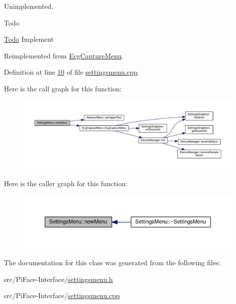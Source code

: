 Unimplemented. 

\begin{DoxyRefDesc}{Todo}
\item[\hyperlink{todo__todo000022}{Todo}]Implement \end{DoxyRefDesc}


Reimplemented from \hyperlink{classEcgCaptureMenu_a610d2985e09cd56cb381e6e443dbbc72}{Ecg\+Capture\+Menu}.



Definition at line \hyperlink{settingsmenu_8cpp_source_l00010}{10} of file \hyperlink{settingsmenu_8cpp_source}{settingsmenu.\+cpp}.



Here is the call graph for this function\+:\nopagebreak
\begin{figure}[H]
\begin{center}
\leavevmode
\includegraphics[width=350pt]{classSettingsMenu_abc441c12e8044c13f1a99791e2ee30d1_cgraph}
\end{center}
\end{figure}




Here is the caller graph for this function\+:\nopagebreak
\begin{figure}[H]
\begin{center}
\leavevmode
\includegraphics[width=350pt]{classSettingsMenu_abc441c12e8044c13f1a99791e2ee30d1_icgraph}
\end{center}
\end{figure}




The documentation for this class was generated from the following files\+:\begin{DoxyCompactItemize}
\item 
src/\+Pi\+Face-\/\+Interface/\hyperlink{settingsmenu_8h}{settingsmenu.\+h}\item 
src/\+Pi\+Face-\/\+Interface/\hyperlink{settingsmenu_8cpp}{settingsmenu.\+cpp}\end{DoxyCompactItemize}
